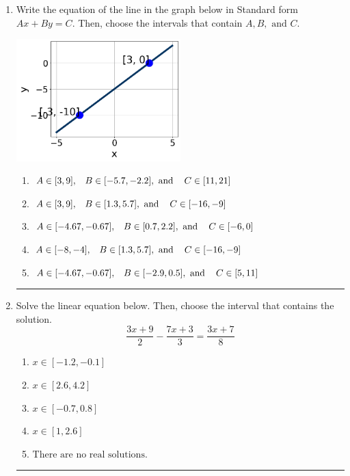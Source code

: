 \documentclass[14pt]{extbook}
\newcommand{\litem}[1]{\item#1\hspace*{-1cm}\rule{\textwidth}{0.4pt}}
\begin{document}
\begin{enumerate}
\litem{
Write the equation of the line in the graph below in Standard form $Ax+By=C$. Then, choose the intervals that contain $A, B, \text{ and } C$.
\begin{center}
    \includegraphics[width=0.5\textwidth]{../Figures/linearGraphToStandardCopyA.png}
\end{center}
\begin{enumerate}[label=\Alph*.]
\item \( A \in [3, 9], \hspace{3mm} B \in [-5.7, -2.2], \text{ and } \hspace{3mm} C \in [11, 21] \)
\item \( A \in [3, 9], \hspace{3mm} B \in [1.3, 5.7], \text{ and } \hspace{3mm} C \in [-16, -9] \)
\item \( A \in [-4.67, -0.67], \hspace{3mm} B \in [0.7, 2.2], \text{ and } \hspace{3mm} C \in [-6, 0] \)
\item \( A \in [-8, -4], \hspace{3mm} B \in [1.3, 5.7], \text{ and } \hspace{3mm} C \in [-16, -9] \)
\item \( A \in [-4.67, -0.67], \hspace{3mm} B \in [-2.9, 0.5], \text{ and } \hspace{3mm} C \in [5, 11] \)

\end{enumerate} }
\litem{
Solve the linear equation below. Then, choose the interval that contains the solution.\[ \frac{3x + 9}{2} - \frac{7x + 3}{3} = \frac{3x + 7}{8} \]\begin{enumerate}[label=\Alph*.]
\item \( x \in [-1.2, -0.1] \)
\item \( x \in [2.6, 4.2] \)
\item \( x \in [-0.7, 0.8] \)
\item \( x \in [1, 2.6] \)
\item \( \text{There are no real solutions.} \)


\end{enumerate}}
\end{enumerate}
\end{document}
